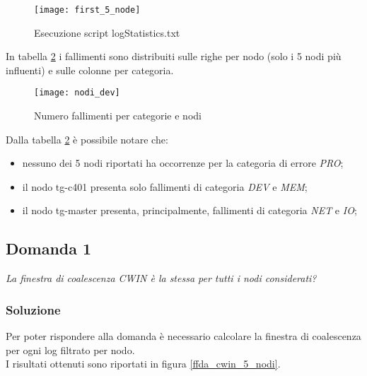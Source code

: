 \begin{figure}[!htbp]
  \centering
  \texttt{[image: first\_5\_node]}
  \caption{Esecuzione script logStatistics.txt}
  \label{ffda_first_5_node}
\end{figure}

In tabella \ref{ffda_nodi_dev} i fallimenti sono distribuiti sulle righe per nodo
(solo i 5 nodi più influenti) e sulle colonne per categoria.\\

\begin{figure}[!htbp]
  \centering
  \texttt{[image: nodi\_dev]}
  \caption{Numero fallimenti per categorie e nodi}
  \label{ffda_nodi_dev}
\end{figure}

Dalla tabella \ref{ffda_nodi_dev} è possibile notare che:
\begin{itemize}
  \item nessuno dei 5 nodi riportati ha occorrenze per la
  categoria di errore \textit{PRO};
  \item il nodo tg-c401 presenta solo fallimenti di categoria \textit{DEV} e
  \textit{MEM};
  \item il nodo tg-master presenta, principalmente, fallimenti di categoria
  \textit{NET} e \textit{IO};
\end{itemize}

\clearpage

\subsection{Domanda 1}
\textit{La finestra di coalescenza CWIN è la stessa per tutti i nodi considerati?}

\subsubsection*{Soluzione}
Per poter rispondere alla domanda è necessario calcolare la finestra di coalescenza
per ogni log filtrato per nodo.\\
I risultati ottenuti sono riportati in figura \ref{ffda_cwin_5_nodi}.\\

